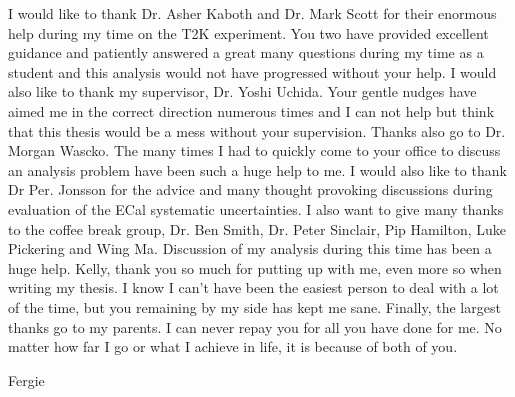 \begin{acknowledgements}
I would like to thank Dr. Asher Kaboth and Dr. Mark Scott for their enormous help during my time on the T2K experiment.  You two have provided excellent guidance and patiently answered a great many questions during my time as a student and this analysis would not have progressed without your help.
\newline
\newline
I would also like to thank my supervisor, Dr. Yoshi Uchida.  Your gentle nudges have aimed me in the correct direction numerous times and I can not help but think that this thesis would be a mess without your supervision.
\newline
\newline
Thanks also go to Dr. Morgan Wascko.  The many times I had to quickly come to your office to discuss an analysis problem have been such a huge help to me.
\newline
\newline
I would also like to thank Dr Per. Jonsson for the advice and many thought provoking discussions during evaluation of the ECal systematic uncertainties.
\newline
\newline
I also want to give many thanks to the coffee break group, Dr. Ben Smith, Dr. Peter Sinclair, Pip Hamilton, Luke Pickering and Wing Ma.  Discussion of my analysis during this time has been a huge help.
\newline
\newline
Kelly, thank you so much for putting up with me, even more so when writing my thesis.  I know I can't have been the easiest person to deal with a lot of the time, but you remaining by my side has kept me sane.
\newline
\newline
Finally, the largest thanks go to my parents.  I can never repay you for all you have done for me.  No matter how far I go or what I achieve in life, it is because of both of you.
\end{acknowledgements}


%

\tableofcontents


%
  {Fergie}
\thispagestyle{empty}

